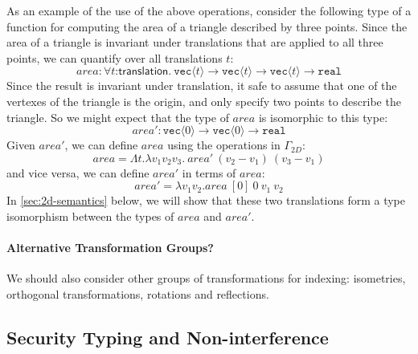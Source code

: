 \documentclass[natbib,preprint]{sigplanconf}
\newcommand{\tyPrim}[2]{\texttt{#1}\langle #2 \rangle}
\newcommand{\tyPrimNm}[1]{\texttt{#1}}
\begin{document}
As an example of the use of the above operations, consider the
following type of a function for computing the area of a triangle
described by three points. Since the area of a triangle is invariant
under translations that are applied to all three points, we can
quantify over all translations $t$:
\begin{displaymath}
  \mathit{area} : \forall t\mathord:\mathsf{translation}.\ \tyPrim{vec}{t} \to \tyPrim{vec}{t} \to \tyPrim{vec}{t} \to \tyPrimNm{real}
\end{displaymath}
Since the result is invariant under translation, it safe to assume
that one of the vertexes of the triangle is the origin, and only
specify two points to describe the triangle. So we might expect that
the type of $\mathit{area}$ is isomorphic to this type:
\begin{displaymath}
  \mathit{area'} : \tyPrim{vec}{0} \to \tyPrim{vec}{0} \to \tyPrimNm{real}
\end{displaymath}
Given $\mathit{area'}$, we can define $\mathit{area}$ using the
operations in $\Gamma_{\mathit{2D}}$:
\begin{displaymath}
  \mathit{area} = \Lambda t. \lambda v_1 v_2 v_3.\ \mathit{area'}\ (v_2 - v_1)\ (v_3 - v_1)
\end{displaymath}
and vice versa, we can define $\mathit{area'}$ in terms of
$\mathit{area}$:
\begin{displaymath}
  \mathit{area'} = \lambda v_1 v_2. \mathit{area}\ [0]\ 0\ v_1\ v_2
\end{displaymath}
In \autoref{sec:2d-semantics} below, we will show that these two
translations form a type isomorphism between the types of
$\mathit{area}$ and $\mathit{area'}$.

\paragraph{Alternative Transformation Groups?}
We should also consider other groups of transformations for indexing:
isometries, orthogonal transformations, rotations and reflections.

\subsection{Security Typing and Non-interference}
\end{document}
